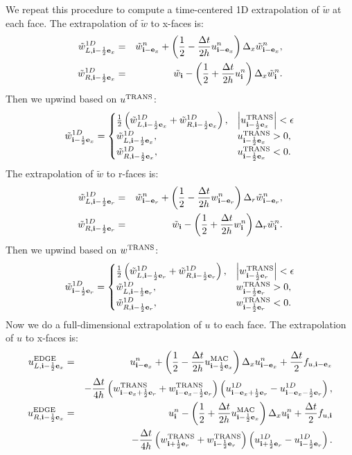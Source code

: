 \documentclass[11pt]{article}
\def\half  {\frac{1}{2}}
\def\dt    {\Delta t}
\def\edge  {\rm EDGE}
\def\mac   {\rm MAC}
\def\trans {\rm TRANS}
\def\eb    {{\bf e}}
\def\ib    {{\bf i}}
\def\wt    {\tilde{w}}
\begin{document}
We repeat this procedure to compute a time-centered 1D extrapolation of $\wt$ at each face.  The extrapolation of $\wt$ to x-faces is:
\begin{eqnarray}
\wt_{L,\ib-\half\eb_x}^{1D} &=& \wt_{\ib-\eb_x}^n + \left(\half - \frac{\dt}{2h}u_{\ib-\eb_x}^n\right)\Delta_x \wt_{\ib-\eb_x}^n, \\
\wt_{R,\ib-\half\eb_x}^{1D} &=& \wt_{\ib} - \left(\half + \frac{\dt}{2h}u_{\ib}^n\right)\Delta_x \wt_{\ib}^n.
\end{eqnarray}
Then we upwind based on $u^{\trans}$:
\begin{equation}
\wt_{\ib-\half\eb_x}^{1D} =
\begin{cases}
\half\left(\wt_{L,\ib-\half\eb_x}^{1D} + \wt_{R,\ib-\half\eb_x}^{1D}\right), & \left|u^{\trans}_{\ib-\half\eb_x}\right| < \epsilon \\
\wt_{L,\ib-\half\eb_x}^{1D}, & u^{\trans}_{\ib-\half\eb_x} > 0, \\
\wt_{R,\ib-\half\eb_x}^{1D}, & u^{\trans}_{\ib-\half\eb_x} < 0. \\
\end{cases}
\end{equation}
The extrapolation of $\wt$ to r-faces is:
\begin{eqnarray}
\wt_{L,\ib-\half\eb_r}^{1D} &=& \wt_{\ib-\eb_r}^n + \left(\half - \frac{\dt}{2h}w_{\ib-\eb_r}^n\right)\Delta_r \wt_{\ib-\eb_r}^n, \label{1D wt_L extrap} \\
\wt_{R,\ib-\half\eb_r}^{1D} &=& \wt_{\ib} - \left(\half + \frac{\dt}{2h}w_{\ib}^n\right)\Delta_r \wt_{\ib}^n. \label{1D wt_R extrap}
\end{eqnarray}
Then we upwind based on $w^{\trans}$:
\begin{equation}
\wt_{\ib-\half\eb_r}^{1D} =
\begin{cases}
\half\left(\wt_{L,\ib-\half\eb_r}^{1D} + \wt_{R,\ib-\half\eb_r}^{1D}\right), & \left|w^{\trans}_{\ib-\half\eb_r}\right| < \epsilon \\
\wt_{L,\ib-\half\eb_r}^{1D}, & w^{\trans}_{\ib-\half\eb_r} > 0, \\
\wt_{R,\ib-\half\eb_r}^{1D}, & w^{\trans}_{\ib-\half\eb_r} < 0. \\
\end{cases}
\end{equation}
Now we do a full-dimensional extrapolation of $u$ to each face.  The extrapolation of $u$ to x-faces is:
\begin{eqnarray}
u_{L,\ib-\half\eb_x}^{\edge} &=& u_{\ib-\eb_x}^n + \left(\half - \frac{\dt}{2h}u_{\ib-\half\eb_x}^{\mac}\right)\Delta_x u_{\ib-\eb_x}^n + \frac{\dt}{2}f_{u,\ib-\eb_x} \nonumber \\
&& - \frac{\dt}{4h}\left(w_{\ib-\eb_x+\half\eb_r}^{\trans}+w_{\ib-\eb_x-\half\eb_r}^{\trans}\right)\left(u_{\ib-\eb_x+\half\eb_r}^{1D} - u_{\ib-\eb_x-\half\eb_r}^{1D}\right), \\
u_{R,\ib-\half\eb_x}^{\edge} &=& u_{\ib}^n - \left(\half + \frac{\dt}{2h}u_{\ib-\half\eb_x}^{\mac}\right)\Delta_x u_{\ib}^n + \frac{\dt}{2}f_{u,\ib} \nonumber \\
&& - \frac{\dt}{4h}\left(w_{\ib+\half\eb_r}^{\trans}+w_{\ib-\half\eb_r}^{\trans}\right)\left(u_{\ib+\half\eb_r}^{1D} - u_{\ib-\half\eb_r}^{1D}\right).
\end{eqnarray}
\end{document}
